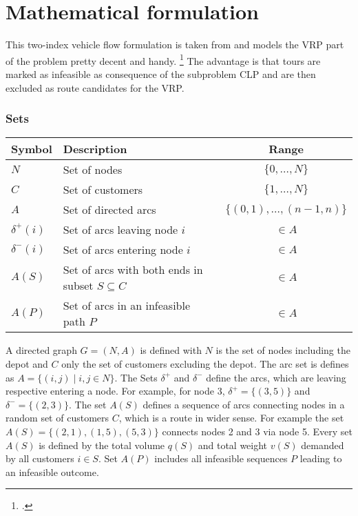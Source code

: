 \chapter{Mathematical formulation}
\label{chap:mathematical_formulation}

This two-index vehicle flow formulation is taken from \cite{tamke_branch-and-cut_2024} and
models the \gls{VRP} part of the problem pretty decent and handy. \footcite[cf.][pp. 6-7]{tamke_branch-and-cut_2024}
The advantage is that tours are marked as infeasible as consequence of
the subproblem \gls{CLP} and are then excluded as route candidates
for the \gls{VRP}.

\subsection*{Sets}
\begin{table}[h]
    \begin{tabular}{llc}
        \toprule
        Symbol        & Description                                          & Range                         \\
        \midrule
        $N$           & Set of nodes                                         & $\{ 0, \dots, N \}$           \\
        $C$           & Set of customers                                     & $\{ 1, \dots, N \} $          \\
        $A$           & Set of directed arcs                                 & $\{(0,1), \dots, (n-1, n) \}$ \\
        $\delta^+(i)$ & Set of arcs leaving node $i$                         & $\in A$                       \\
        $\delta^-(i)$ & Set of arcs entering node $i$                        & $\in A$                       \\
        $A(S)$        & Set of arcs with both ends in subset $S \subseteq C$ & $\in A$                       \\
        $A(P)$        & Set of arcs in an infeasible path $P$                & $\in A$                       \\
        \bottomrule
    \end{tabular}
\end{table}
\vspace{0.2em}

A directed graph $G=(N,A)$ is defined  with $N$ is the set of nodes including
the depot and $C$ only the set of customers excluding the depot. The arc set is
defines as $A = \{ (i, j) \mid i, j \in N \}$. The Sets $\delta^+$ and $\delta^-$ define
the arcs, which are leaving respective entering a node. For example, for node 3, $\delta^+ = \{(3,5)\}$ and $\delta^-= \{(2,3)\}$.
The set $A(S)$ defines a sequence of arcs connecting nodes in a random set of customers $C$,
which is a route in wider sense. For example the set $A(S)=\{(2,1),(1,5),(5,3)\}$ connects nodes
2 and 3 via node 5. Every set $A(S)$ is defined by the total volume $q(S)$ and total weight $v(S)$
demanded by all customers $i \in S$. Set $A(P)$ includes all infeasible sequences $P$ leading
to an infeasible outcome.


